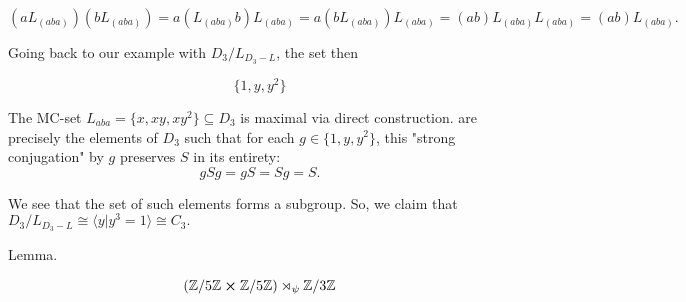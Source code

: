 \documentclass[a4paper,12pt]{article}
\newcommand{\Z}{\mathbb{Z}}
\begin{document}
\[
(aL_{(aba)}) (b L_{(aba)}) = 
a (L_{(aba)} b ) L_{(aba)} = 
a (b L_{(aba)}) L_{(aba)} = 
(ab) L_{(aba)}L_{(aba)} = 
(ab) L_{(aba)}. 
\]

Going back to our example with $D_{3} / L_{D_3 - L}$, the set then

\[
\{1, y, y^2\}
\]

The MC-set $L_{aba} = \{x, xy, xy^2\} \subseteq D_{3}$ is maximal via direct construction.
are precisely the elements of $D_3$ such that for each $g \in \{1, y, y^2\}$, this "strong conjugation" by $g$ preserves $S$ in its entirety:
\[
g S g = gS = Sg= S.
\]

We see that the set of such elements forms a subgroup. So, we claim that $D_{3} / L_{D_3 - L} \cong \langle y | y^3 =1 \rangle \cong C_3.$

Lemma. 

\[(\Z / 5\Z \cross \Z / 5\Z ) \rtimes_{\psi} \Z / 3\Z\]
\end{document}
